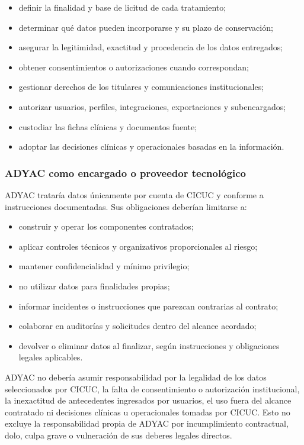 \documentclass[
]{article}
\providecommand{\tightlist}{%
  \setlength{\itemsep}{0pt}\setlength{\parskip}{0pt}}
\begin{document}
\begin{itemize}
\tightlist
\item
  definir la finalidad y base de licitud de cada tratamiento;
\item
  determinar qué datos pueden incorporarse y su plazo de conservación;
\item
  asegurar la legitimidad, exactitud y procedencia de los datos
  entregados;
\item
  obtener consentimientos o autorizaciones cuando correspondan;
\item
  gestionar derechos de los titulares y comunicaciones institucionales;
\item
  autorizar usuarios, perfiles, integraciones, exportaciones y
  subencargados;
\item
  custodiar las fichas clínicas y documentos fuente;
\item
  adoptar las decisiones clínicas y operacionales basadas en la
  información.
\end{itemize}

\hypertarget{adyac-como-encargado-o-proveedor-tecnoluxf3gico}{%
\subsubsection{ADYAC como encargado o proveedor
tecnológico}\label{adyac-como-encargado-o-proveedor-tecnoluxf3gico}}

ADYAC trataría datos únicamente por cuenta de CICUC y conforme a
instrucciones documentadas. Sus obligaciones deberían limitarse a:

\begin{itemize}
\tightlist
\item
  construir y operar los componentes contratados;
\item
  aplicar controles técnicos y organizativos proporcionales al riesgo;
\item
  mantener confidencialidad y mínimo privilegio;
\item
  no utilizar datos para finalidades propias;
\item
  informar incidentes o instrucciones que parezcan contrarias al
  contrato;
\item
  colaborar en auditorías y solicitudes dentro del alcance acordado;
\item
  devolver o eliminar datos al finalizar, según instrucciones y
  obligaciones legales aplicables.
\end{itemize}

ADYAC no debería asumir responsabilidad por la legalidad de los datos
seleccionados por CICUC, la falta de consentimiento o autorización
institucional, la inexactitud de antecedentes ingresados por usuarios,
el uso fuera del alcance contratado ni decisiones clínicas u
operacionales tomadas por CICUC. Esto no excluye la responsabilidad
propia de ADYAC por incumplimiento contractual, dolo, culpa grave o
vulneración de sus deberes legales directos.
\end{document}
